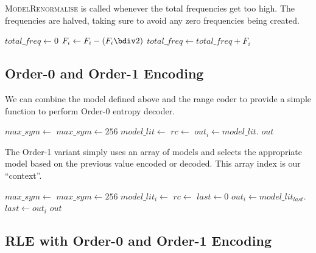 \documentclass[a4paper]{article}
\begin{document}
\textsc{ModelRenormalise} is called whenever the total frequencies get too high.
The frequencies are halved, taking sure to avoid any zero frequencies being created.

\begin{algorithmic}[1]
  \State $total\_freq \gets 0$
    \State $F_i \gets F_i - (F_i \bdiv 2)$
    \State $total\_freq \gets total\_freq + F_i$
  \EndFor
\EndProcedure
\end{algorithmic}

\subsection{Order-0 and Order-1 Encoding}

We can combine the model defined above and the range coder to provide a simple function to perform Order-0 entropy decoder.

\begin{algorithmic}[1]
  \State $max\_sym \gets $
    \State $max\_sym \gets 256$
  \EndIf
  \State $model\_lit \gets $
  \Statex
  \State $rc \gets $
    \State $out_i \gets model\_lit.$
  \EndFor
  \State \Return $out$
\EndFunction
\end{algorithmic}

The Order-1 variant simply uses an array of models and selects the appropriate model based on the previous value encoded or decoded.
This array index is our ``context''.

\begin{algorithmic}[1]
  \State $max\_sym \gets $
    \State $max\_sym \gets 256$
  \EndIf
    \State $model\_lit_i \gets $
  \EndFor
  \Statex
  \State $rc \gets $
  \State $last \gets 0$
    \State $out_i \gets model\_lit_{last}.$
    \State $last \gets out_i$
  \EndFor
  \State \Return $out$
\EndFunction
\end{algorithmic}

\subsection{RLE with Order-0 and Order-1 Encoding}
\end{document}
